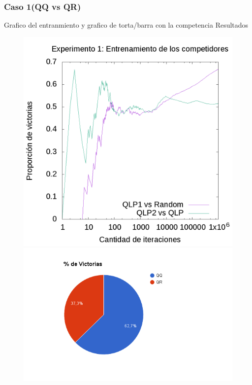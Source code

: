 \documentclass[10pt, a4paper]{article}
\begin{document}
\subsubsection{Caso 1(QQ vs QR)}

Grafico del entranmiento y grafico de torta/barra con la competencia Resultados

\begin{figure}[ht]
  \begin{minipage}[c]{1\textwidth}
  \includegraphics[scale=0.32]{E1train.png}
  \includegraphics[scale=0.4]{QRvsQQ.png}
  \end{minipage}
\end{figure}
\end{document}
